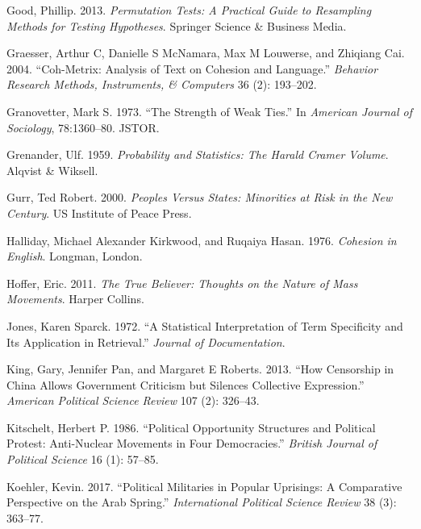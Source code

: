 \documentclass[
  english,
  man]{apa6}
\begin{document}
\leavevmode\hypertarget{ref-good2013permutation}{}%
Good, Phillip. 2013. \emph{Permutation Tests: A Practical Guide to Resampling Methods for Testing Hypotheses}. Springer Science \& Business Media.

\leavevmode\hypertarget{ref-graesser2004coh}{}%
Graesser, Arthur C, Danielle S McNamara, Max M Louwerse, and Zhiqiang Cai. 2004. ``Coh-Metrix: Analysis of Text on Cohesion and Language.'' \emph{Behavior Research Methods, Instruments, \& Computers} 36 (2): 193--202.

\leavevmode\hypertarget{ref-granovetter1977strength}{}%
Granovetter, Mark S. 1973. ``The Strength of Weak Ties.'' In \emph{American Journal of Sociology}, 78:1360--80. JSTOR.

\leavevmode\hypertarget{ref-grenander1959probability}{}%
Grenander, Ulf. 1959. \emph{Probability and Statistics: The Harald Cramer Volume}. Alqvist \& Wiksell.

\leavevmode\hypertarget{ref-gurr2000peoples}{}%
Gurr, Ted Robert. 2000. \emph{Peoples Versus States: Minorities at Risk in the New Century}. US Institute of Peace Press.

\leavevmode\hypertarget{ref-halliday1976cohesion}{}%
Halliday, Michael Alexander Kirkwood, and Ruqaiya Hasan. 1976. \emph{Cohesion in English}. Longman, London.

\leavevmode\hypertarget{ref-Hoffer2011true}{}%
Hoffer, Eric. 2011. \emph{The True Believer: Thoughts on the Nature of Mass Movements}. Harper Collins.

\leavevmode\hypertarget{ref-jones1972statistical}{}%
Jones, Karen Sparck. 1972. ``A Statistical Interpretation of Term Specificity and Its Application in Retrieval.'' \emph{Journal of Documentation}.

\leavevmode\hypertarget{ref-king2013censorship}{}%
King, Gary, Jennifer Pan, and Margaret E Roberts. 2013. ``How Censorship in China Allows Government Criticism but Silences Collective Expression.'' \emph{American Political Science Review} 107 (2): 326--43.

\leavevmode\hypertarget{ref-kitschelt1986political}{}%
Kitschelt, Herbert P. 1986. ``Political Opportunity Structures and Political Protest: Anti-Nuclear Movements in Four Democracies.'' \emph{British Journal of Political Science} 16 (1): 57--85.

\leavevmode\hypertarget{ref-koehler2017political}{}%
Koehler, Kevin. 2017. ``Political Militaries in Popular Uprisings: A Comparative Perspective on the Arab Spring.'' \emph{International Political Science Review} 38 (3): 363--77.
\end{document}
